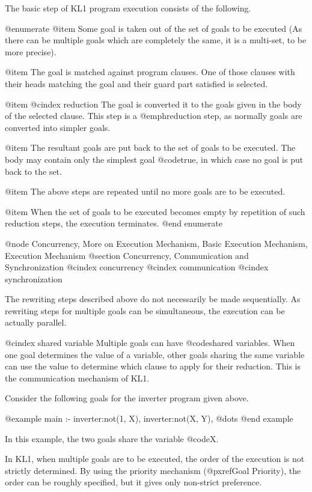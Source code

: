 The basic step of KL1 program execution consists of the following.

@enumerate
@item
Some goal is taken out of the set of goals to be executed (As there can
be multiple goals which are completely the same, it is a multi-set, to
be more precise).

@item
The goal is matched against program clauses.  One of those clauses with
their heads matching the goal and their guard part satisfied is selected.

@item
@cindex reduction
The goal is converted it to the goals given in the body of the selected
clause.  This step is a @emph{reduction} step, as normally goals are
converted into simpler goals.

@item
The resultant goals are put back to the set of goals to be executed.
The body may contain only the simplest goal @code{true}, in which case
no goal is put back to the set.

@item
The above steps are repeated until no more goals are to be executed.

@item
When the set of goals to be executed becomes empty by repetition of such
reduction steps, the execution terminates.
@end enumerate

@node Concurrency, More on Execution Mechanism, Basic Execution Mechanism, Execution Mechanism
@section Concurrency, Communication and Synchronization
@cindex concurrency
@cindex communication
@cindex synchronization

The rewriting steps described above do not necessarily be made
sequentially.  As rewriting steps for multiple goals can be
simultaneous, the execution can be actually parallel.

@cindex shared variable
Multiple goals can have @code{shared variables}.  When one goal
determines the value of a variable, other goals sharing the same
variable can use the value to determine which clause to apply for their
reduction.  This is the communication mechanism of KL1.

Consider the following goals for the inverter program given above.

@example
main :- inverter:not(1, X), inverter:not(X, Y), @dots{}
@end example

In this example, the two goals share the variable @code{X}.

In KL1, when multiple goals are to be executed, the order of the
execution is not strictly determined.  By using the priority mechanism
(@pxref{Goal Priority}), the order can be roughly specified, but it
gives only non-strict preference.

